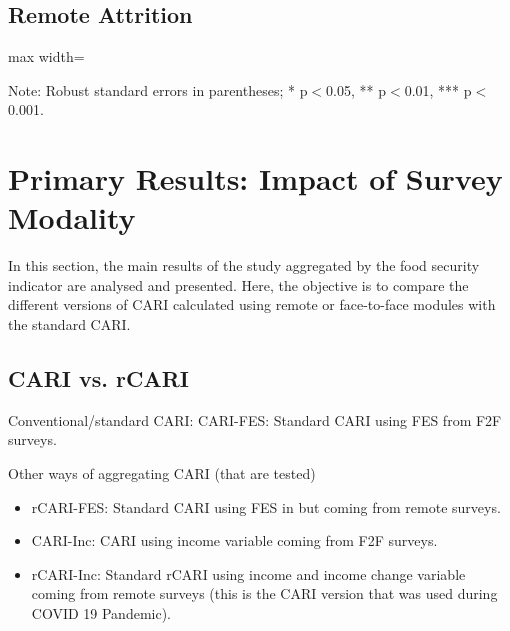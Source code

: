 \documentclass[11pt,harvard]{article}
\begin{document}
\pagebreak

\subsection{Remote Attrition}
\begin{table}[htbp]
	\centering
	\begin{adjustbox}{max width=\textwidth}
		\begin{threeparttable}
			\caption{Balance Table for Randomized Questionnaire Length Assignment in Remote Survey: Completed vs. Attrition}
			\scriptsize
			 
			\label{tab:CAR_Listing_Demo_Attrition_Remote}
			\begin{tablenotes}
				\item Note: Robust standard errors in parentheses; * p$<$0.05, ** p$<$0.01, *** p$<$0.001.
			\end{tablenotes}
		\end{threeparttable}
	\end{adjustbox}
\end{table}

	
\section{Primary Results: Impact of Survey Modality}
	
In this section, the main results of the study aggregated by the food security indicator are analysed and presented. Here, the objective is to compare the different versions of CARI calculated using remote or face-to-face modules with the standard CARI.
	
	\subsection{CARI vs. rCARI}
	Conventional/standard CARI:  CARI-FES: Standard CARI using FES from F2F surveys.
	
	Other ways of aggregating CARI (that are tested)
	\begin{itemize}[label=--, left=1.5em]
		\item rCARI-FES: Standard CARI using FES in but coming from remote surveys.
		\item CARI-Inc: CARI using income variable coming from F2F surveys.
		\item rCARI-Inc: Standard rCARI using income and income change variable coming from remote surveys (this is the CARI version that was used during COVID 19 Pandemic).
	\end{itemize}
	
\end{document}
